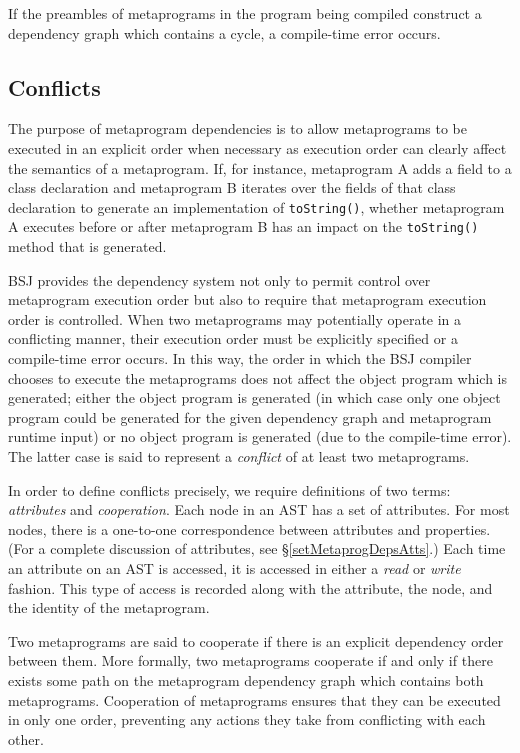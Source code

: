\documentclass[a4paper,10pt]{report}
\newcommand{\refS}[1]{\hyperref[#1]{\S\ref{#1}}}
\newcommand{\vocab}[1]{\textit{#1}}
\begin{document}
If the preambles of metaprograms in the program being compiled construct a dependency graph which contains a cycle, a compile-time error occurs.

\subsection{Conflicts}
\label{secMetaprogDepsConflicts}

The purpose of metaprogram dependencies is to allow metaprograms to be executed in an explicit order when necessary as execution order can clearly affect the semantics of a metaprogram.  If, for instance, metaprogram A adds a field to a class declaration and metaprogram B iterates over the fields of that class declaration to generate an implementation of \verb`toString()`, whether metaprogram A executes before or after metaprogram B has an impact on the \verb`toString()` method that is generated.

BSJ provides the dependency system not only to permit control over metaprogram execution order but also to require that metaprogram execution order is controlled.  When two metaprograms may potentially operate in a conflicting manner, their execution order must be explicitly specified or a compile-time error occurs.  In this way, the order in which the BSJ compiler chooses to execute the metaprograms does not affect the object program which is generated; either the object program is generated (in which case only one object program could be generated for the given dependency graph and metaprogram runtime input) or no object program is generated (due to the compile-time error).  The latter case is said to represent a \vocab{conflict} of at least two metaprograms.

In order to define conflicts precisely, we require definitions of two terms: \vocab{attributes} and \vocab{cooperation}.  Each node in an AST has a set of attributes.  For most nodes, there is a one-to-one correspondence between attributes and properties.  (For a complete discussion of attributes, see \refS{setMetaprogDepsAtts}.)  Each time an attribute on an AST is accessed, it is accessed in either a \textit{read} or \textit{write} fashion.  This type of access is recorded along with the attribute, the node, and the identity of the metaprogram.

Two metaprograms are said to cooperate if there is an explicit dependency order between them.  More formally, two metaprograms cooperate if and only if there exists some path on the metaprogram dependency graph which contains both metaprograms.  Cooperation of metaprograms ensures that they can be executed in only one order, preventing any actions they take from conflicting with each other.
\end{document}
